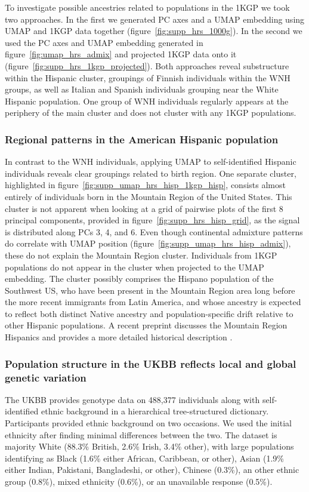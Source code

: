 \documentclass[12pt]{pnas-new}
\begin{document}
To investigate possible ancestries related to populations in the 1KGP we took two approaches. In the first we generated PC axes and a UMAP embedding using UMAP and 1KGP data together (figure~\ref{fig:supp_hrs_1000g}). In the second we used the PC axes and UMAP embedding generated in figure~\ref{fig:umap_hrs_admix} and projected 1KGP data onto it (figure~\ref{fig:supp_hrs_1kgp_projected}). Both approaches reveal substructure within the Hispanic cluster, groupings of Finnish individuals within the WNH groups, as well as Italian and Spanish individuals grouping near the White Hispanic population. One group of WNH individuals regularly appears at the periphery of the main cluster and does not cluster with any 1KGP populations.

\subsubsection*{Regional patterns in the American Hispanic population} In contrast to the WNH individuals, applying UMAP to self-identified Hispanic individuals reveals clear groupings related to birth region. One separate cluster, highlighted in figure~\ref{fig:supp_umap_hrs_hisp_1kgp_hisp}, consists almost entirely of individuals born in the Mountain Region of the United States. This cluster is not apparent when looking at a grid of pairwise plots of the first 8 principal components, provided in figure~\ref{fig:supp_hrs_hisp_grid}, as the signal is distributed along PCs 3, 4, and 6. Even though continental admixture patterns do correlate with UMAP position (figure~\ref{fig:supp_umap_hrs_hisp_admix}), these do not explain the Mountain Region cluster. Individuals from 1KGP populations do not appear in the cluster when projected to the UMAP embedding. The cluster possibly comprises the Hispano population of the Southwest US, who have been present in the Mountain Region area long before the more recent immigrants from Latin America, and whose ancestry is expected to reflect both distinct Native ancestry and population-specific drift relative to other Hispanic populations. A recent preprint discusses the Mountain Region Hispanics and provides a more detailed historical description \cite{Jordan333609}.  

\subsubsection*{Population structure in the UKBB reflects local and global genetic variation} The UKBB provides genotype data on 488,377 individuals along with self-identified ethnic background in a hierarchical tree-structured dictionary. Participants provided ethnic background on two occasions. We used the initial ethnicity after finding minimal differences between the two. The dataset is majority White (88.3\% British, 2.6\% Irish, 3.4\% other), with large populations identifying as Black (1.6\% either African, Caribbean, or other), Asian (1.9\% either Indian, Pakistani, Bangladeshi, or other), Chinese (0.3\%), an other ethnic group (0.8\%), mixed ethnicity (0.6\%), or an unavailable response (0.5\%). 
\end{document}
